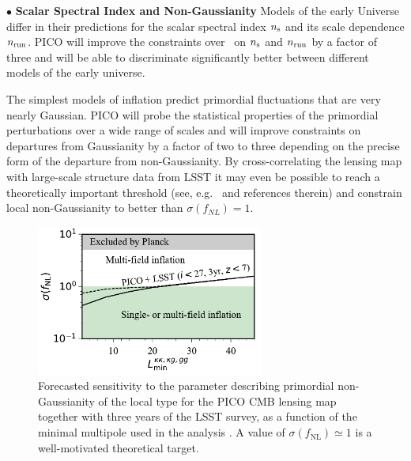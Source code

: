 \documentclass[PICOReport.tex]{subfiles}
\begin{document}
\noindent$\bullet$ {\bf Scalar Spectral Index and Non-Gaussianity} \hspace{0.1in} Models of the early Universe  differ in their predictions for the scalar spectral index $n_{\rm s}$ and its scale dependence $n_{\rm run}$. PICO will improve the constraints over \planck\ on $n_{\rm s}$ and $n_{\rm run}$ by a factor of three and will be able to discriminate significantly better between different models of the early universe. 


The simplest models of inflation predict primordial fluctuations that are very nearly Gaussian. PICO will probe the statistical properties of the primordial perturbations over a wide range of scales and will improve constraints on departures from Gaussianity by a factor of two to three depending on the precise form of the departure from non-Gaussianity. By cross-correlating the lensing map with large-scale structure data from LSST it may even be possible to reach a theoretically important threshold (see, e.g.~\cite{2014arXiv1412.4671A} and references therein) and constrain local non-Gaussianity to better than $\sigma(f_{NL})=1$. 

\begin{figure}[h]
\hspace{-0.in}
\parbox{3.1in}{\centerline {
\includegraphics[width=2.95in]{images/PICO_fnl_lmin_PICOv4.1b_deproj0_SENS0.pdf} } }
\hspace{0.in}
\parbox{3.3in}{
\caption{\captiontext
Forecasted sensitivity to the parameter describing primordial non-Gaussianity of the local type for the PICO CMB lensing map together with three years of the LSST survey, as a function of the minimal multipole used in the analysis . A value of $\sigma (f_\mathrm{NL}) \simeq 1$ is a well-motivated theoretical target.
\label{fig:fnlconstraint}
} }
\vspace{-0.1in}
\end{figure}
\end{document}
